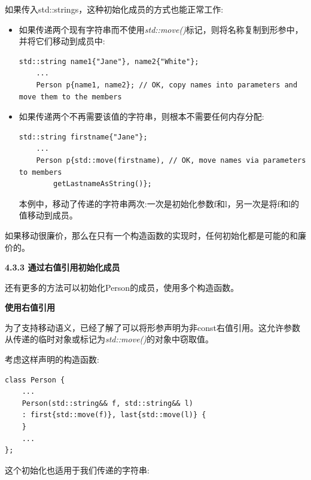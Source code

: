 如果传入std::strings，这种初始化成员的方式也能正常工作:\par

\begin{itemize}
	\item 如果传递两个现有字符串而不使用\textit{std::move()}标记，则将名称复制到形参中，并将它们移动到成员中:\par
	\begin{lstlisting}[caption={}]
	std::string name1{"Jane"}, name2{"White"};
	...
	Person p{name1, name2}; // OK, copy names into parameters and move them to the members
	\end{lstlisting}
	\item 如果传递两个不再需要该值的字符串，则根本不需要任何内存分配:
	\begin{lstlisting}[caption={}]
	std::string firstname{"Jane"};
	...
	Person p{std::move(firstname), // OK, move names via parameters to members
		getLastnameAsString()};
	\end{lstlisting}
	本例中，移动了传递的字符串两次:一次是初始化参数f和l，另一次是将f和l的值移动到成员。
\end{itemize}

如果移动很廉价，那么在只有一个构造函数的实现时，任何初始化都是可能的和廉价的。\par

\hspace*{\fill} \par %
\textbf{4.3.3 通过右值引用初始化成员}

还有更多的方法可以初始化Person的成员，使用多个构造函数。\par

\hspace*{\fill} \par %
\textbf{使用右值引用}

为了支持移动语义，已经了解了可以将形参声明为非const右值引用。这允许参数从传递的临时对象或标记为\textit{std::move()}的对象中窃取值。\par

考虑这样声明的构造函数:\par

\begin{lstlisting}[caption={}]
class Person {
	...
	Person(std::string&& f, std::string&& l)
	: first{std::move(f)}, last{std::move(l)} {
	}
	...
};
\end{lstlisting}

这个初始化也适用于我们传递的字符串:\par

